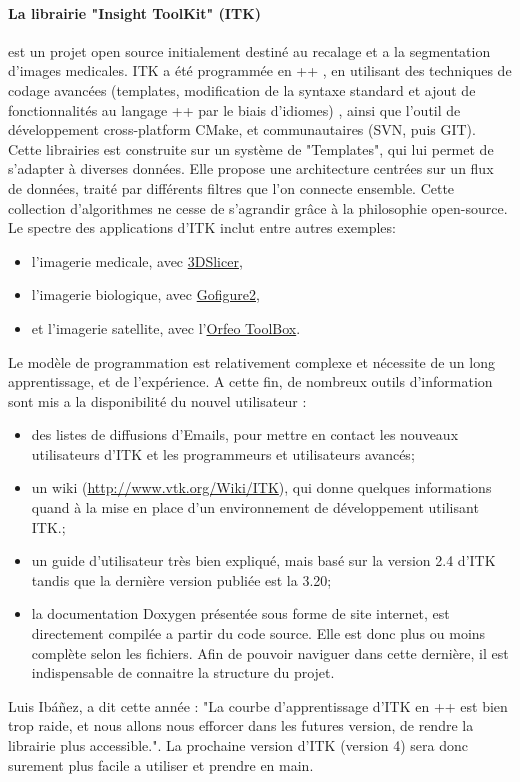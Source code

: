 \paragraph{La librairie "Insight ToolKit" (ITK)} est un projet open source initialement destiné au recalage et a la segmentation d'images medicales. ITK a été programmée en \C++ , en utilisant des techniques de codage avancées (templates, modification de la syntaxe standard et ajout de fonctionnalités au langage \C++ par le biais d'idiomes) , ainsi que l'outil de développement cross-platform CMake, et communautaires (SVN, puis GIT). 
Cette librairies est construite sur un système de "Templates", qui lui permet de s'adapter à diverses données. Elle propose une architecture centrées sur un flux de données, traité par différents filtres que l'on connecte ensemble.
Cette collection d'algorithmes ne cesse de s'agrandir grâce à la philosophie open-source. Le spectre des applications d'ITK inclut entre autres exemples:  
\begin{itemize}
  \item l'imagerie medicale, avec \href{http://www.slicer.org/}{3DSlicer},
  \item l'imagerie biologique, avec \href{http://gofigure2.sourceforge.net/}{Gofigure2},
  \item et l'imagerie satellite, avec l'\href{http://www.orfeo-toolbox.org/otb/}{Orfeo ToolBox}.
\end{itemize}
Le modèle de programmation est relativement complexe et nécessite de un long apprentissage, et de l'expérience. A cette fin, de nombreux outils d'information sont mis a la disponibilité du nouvel utilisateur :
\begin{itemize}
  \item des listes de diffusions d'Emails, pour mettre en contact les nouveaux utilisateurs d'ITK et les programmeurs et utilisateurs avancés;
  \item un wiki (\url{http://www.vtk.org/Wiki/ITK}), qui donne quelques informations quand à la mise en place d'un environnement de développement utilisant ITK.;
  \item un guide d'utilisateur très bien expliqué, mais basé sur la version 2.4 d'ITK tandis que la dernière version publiée est la 3.20;
  \item la documentation Doxygen présentée sous forme de site internet, est directement compilée a partir du code source. Elle est donc plus ou moins complète selon les fichiers. Afin de pouvoir naviguer dans cette dernière, il est indispensable de connaitre la structure du projet.
\end{itemize}
Luis Ibáñez, a dit cette année : "La courbe d'apprentissage d'ITK en \C++ est bien trop raide, et nous allons nous efforcer dans les futures version, de rendre la librairie plus accessible.". La prochaine version d'ITK (version 4) sera donc surement plus facile a utiliser et prendre en main.

